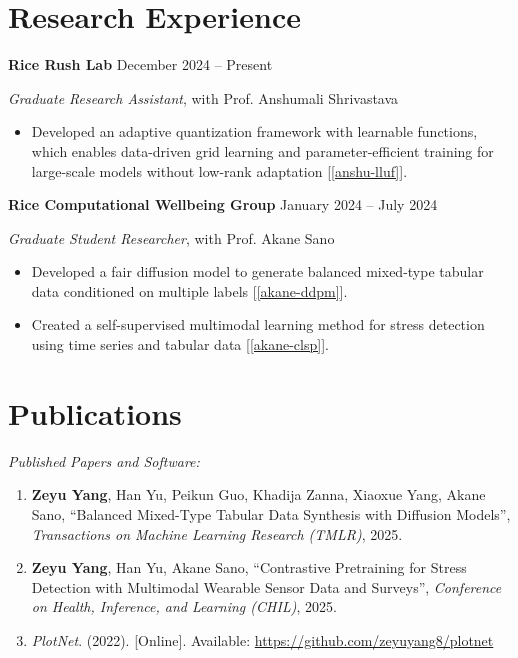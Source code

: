 \documentclass[11pt]{article}
\begin{document}
\section*{Research Experience}

\textbf{Rice Rush Lab} \hfill December 2024 -- Present

\textit{Graduate Research Assistant}, with Prof. Anshumali Shrivastava

\begin{itemize}
    \item Developed an adaptive quantization framework with learnable functions, which enables data-driven grid learning and parameter-efficient training for large-scale models without low-rank adaptation [\ref{anshu-lluf}].
\end{itemize}

\vspace{\lineskip}

\textbf{Rice Computational Wellbeing Group} \hfill January 2024 -- July 2024

\textit{Graduate Student Researcher}, with Prof. Akane Sano

\begin{itemize}
    \item Developed a fair diffusion model to generate balanced mixed-type tabular data conditioned on multiple labels [\ref{akane-ddpm}].
    \item Created a self-supervised multimodal learning method for stress detection using time series and tabular data [\ref{akane-clsp}].
\end{itemize}

\section*{Publications}

\textit{Published Papers and Software:}

\begin{enumerate}
    \item \label{akane-ddpm} \textbf{Zeyu Yang}, Han Yu, Peikun Guo, Khadija Zanna, Xiaoxue Yang, Akane Sano,
    ``Balanced Mixed-Type Tabular Data Synthesis with Diffusion Models'', \textit{Transactions on Machine Learning Research (TMLR)}, 2025.
    \item \label{akane-clsp} \textbf{Zeyu Yang}, Han Yu, Akane Sano, ``Contrastive Pretraining for Stress Detection with Multimodal Wearable Sensor Data and Surveys'', \textit{Conference on Health, Inference, and Learning (CHIL)}, 2025.
    \item \label{joe-plotnet} \textit{PlotNet}. (2022). [Online]. Available: \url{https://github.com/zeyuyang8/plotnet}
\end{enumerate}
\end{document}

